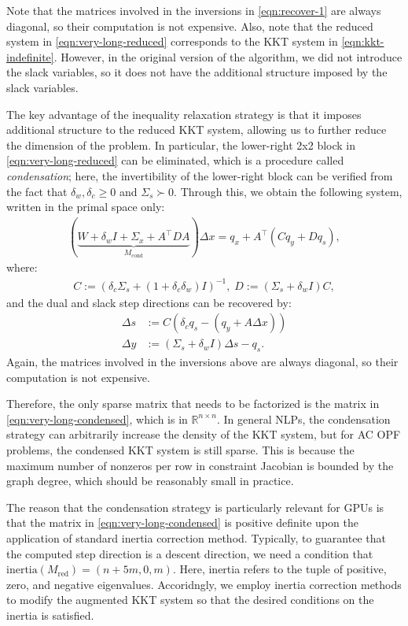 Note that the matrices involved in the inversions in \eqref{eqn:recover-1}
are always diagonal, so their computation is not expensive.
Also, note that the reduced system in \eqref{eqn:very-long-reduced}
corresponds to the KKT system in \eqref{eqn:kkt-indefinite}. However,
in the original version of the algorithm, we did not introduce the
slack variables, so it does not have the additional structure imposed
by the slack variables.

The key advantage of the inequality relaxation strategy is that it
imposes additional structure to the reduced KKT system, allowing us to
further reduce the dimension of the problem. In particular, the
lower-right 2x2 block in \eqref{eqn:very-long-reduced} can be
eliminated, which is a procedure called {\it condensation}; here, the invertibility of the lower-right block can be verified from the fact that $\delta_w,\delta_c\geq 0$ and $\Sigma_s\succ 0$. Through this,
we obtain the following system, written in the  primal
space only:
\begin{align}\label{eqn:very-long-condensed}
  (\underbrace{W + \delta_wI + \Sigma_x + A^{\top} D A}_{M_\text{cond}} ) \Delta x = q_x + A^\top (C q_y +  Dq_s ),
\end{align}
where:
\begin{align*}
  C := \left(\delta_c \Sigma_s + (1+\delta^{}_c\delta^{}_w) I\right)^{-1}, \;
  D := \left(\Sigma_s + \delta^{}_w I\right)C,
\end{align*}
and the dual and slack step directions can be recovered by:
\begin{align}
  \Delta s &:= C \left(\delta_c q_s - (q_y + A\Delta x)\right)\nonumber\\
  \Delta y &:= (\Sigma_s + \delta_w I) \Delta s -q_s.\label{eqn:recover-2}
\end{align}
Again, the matrices involved in the inversions above are always
diagonal, so their computation is not expensive.

Therefore, the only sparse matrix that needs to be factorized is the
matrix in \eqref{eqn:very-long-condensed}, which is in
$\mathbb{R}^{n\times n}$. In general NLPs, the condensation strategy
can arbitrarily increase the density of the KKT system, but for AC OPF
problems, the condensed KKT system is still sparse.
This is because the maximum number of nonzeros per row in constraint
Jacobian is bounded by the graph degree, which should be reasonably
small in practice.

The reason that the condensation strategy is particularly relevant for
GPUs is that the matrix in \eqref{eqn:very-long-condensed} is positive
definite upon the application of standard inertia correction
method. Typically, to guarantee that the computed step direction is a
descent direction, we need a condition that
$\text{inertia}(M_\text{red}) = (n+5m,0,m)$. Here, inertia refers to
the tuple of positive, zero, and negative eigenvalues. Accoridngly, we
employ inertia correction methods to modify the augmented KKT system
so that the desired conditions on the inertia is satisfied.

